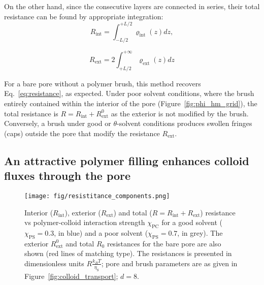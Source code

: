 \documentclass[12pt, a4paper]{article}
\begin{document}
On the other hand, since the consecutive layers are connected in series, their total resistance can be found by appropriate integration:
\begin{equation}
    R_{\text{int}} = \int_{-L/2}^{+L/2}\varrho_{\text{int}}(z) dz,
    \label{R_int}
\end{equation}

\begin{equation}
   R_{\text{ext}} =2\int_{+L/2}^{+\infty}\varrho_{\text{ext}}(z)dz
    \label{R_ext}
\end{equation}

For a bare pore without a polymer brush, this method recovers Eq.~\ref{eq:resistance}, as expected.
Under poor solvent conditions, where the brush entirely contained within the interior of the pore (Figure~\ref{fig:phi_hm_grid}), the total resistance is $R = R_{\text{int}} + R_{\text{ext}}^{0}$ as the exterior is not modified by the brush.
Conversely, a brush under good or $\theta$-solvent conditions produces swollen fringes (caps) outside the pore that modify the resistance $R_{\text{ext}}$.


\subsection{An attractive polymer filling enhances colloid fluxes through the pore}

\begin{figure}
    \centering
    \texttt{[image: fig/resistitance\_components.png]}
    \caption{
    Interior ($R_{\text{int}}$), exterior ($R_{\text{ext}}$) and total ($R = R_{\text{int}} + R_{\text{ext}}$) resistance  vs polymer-colloid interaction strength $\chi_{\text{PC}}$ for a good solvent ($\chi_{\text{PS}} = 0.3$, in blue) and a poor solvent ($\chi_{\text{PS}} = 0.7$, in grey).
    The exterior $R_{\text{ext}}^{0}$ and total $R_0$ resistances for the bare pore are also shown (red lines of matching type).  
    The resistances is presented in dimensionless units $R\tfrac{k_{B}T}{\eta_{\text{S}}}$; pore and brush parameters are as given in Figure~\ref{fig:colloid_transport}; $d = 8$.
    }
    \label{fig:R_vs_chi_PC}
\end{figure}
\end{document}
